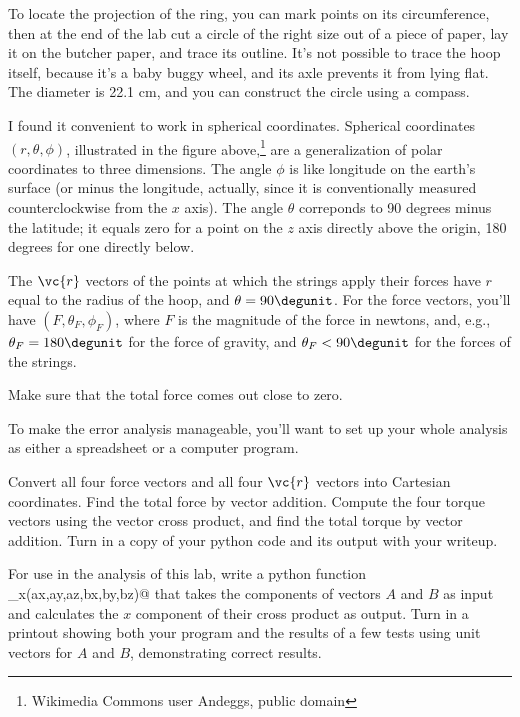 To locate the projection of the ring, you can mark points on its circumference, then at the end of the lab cut a circle of the right
size out of a piece of paper, lay it on the butcher paper, and trace its outline. It's not possible to trace the hoop itself, because
it's a baby buggy wheel, and its axle prevents it from lying flat. The diameter is 22.1 cm, and you can construct the circle using
a compass.


I found it convenient to work in spherical coordinates. Spherical coordinates $(r,\theta,\phi)$, illustrated in the figure above,\footnote{Wikimedia Commons user Andeggs, public domain} %
are a generalization of polar coordinates to three dimensions. The angle $\phi$ is like longitude on the earth's surface
(or minus the longitude, actually, since it is conventionally measured counterclockwise from the $x$ axis).
The angle $\theta$ correponds to 90 degrees minus the latitude; it equals zero for a point on the $z$ axis directly above the origin, 180 degrees
for one directly below.

The $\vc{r}$ vectors of the points
at which the strings apply their forces have $r$ equal to the radius of the hoop, and $\theta=90 \degunit$. For the force vectors,
you'll have $(F,\theta_F,\phi_F)$, where $F$ is the magnitude of the force in newtons, and, e.g., $\theta_F=180\degunit$ for the
force of gravity, and $\theta_F<90\degunit$ for the forces of the strings.

\selfcheck

Make sure that the total force comes out close to zero.

\analysis

To make the error analysis manageable, you'll want to set up your whole analysis as either a spreadsheet or
a computer program.

Convert all four force vectors and all four $\vc{r}$ vectors into Cartesian coordinates. Find the total force by vector addition.
Compute the four torque vectors using the vector cross product, and find the total torque by vector addition.
Turn in a copy of your python code and its output with your writeup. 

\prelab

\prelabquestion For use in the analysis of this lab, write a python function \verb@cross_x(ax,ay,az,bx,by,bz)@ that
takes the components of vectors $A$ and $B$ as input and calculates the $x$ component of their cross product as output.
Turn in a printout showing both your program and the results of a few tests using unit vectors for $A$ and $B$,
demonstrating correct results.

